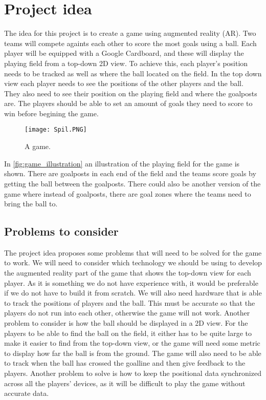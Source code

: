 \section{Project idea}
The idea for this project is to create a game using augmented reality (AR). 
Two teams will compete againts each other to score the most goals using a ball. 
Each player will be equipped with a Google Cardboard, and these will display the playing field from a top-down 2D view. 
To achieve this, each player's position needs to be tracked as well as where the ball located on the field.
In the top down view each player needs to see the positions of the other players and the ball.
They also need to see their position on the playing field and where the goalposts are.
The players should be able to set an amount of goals they need to score to win before begining the game. 
\begin{figure}[H]
    \centering
    \texttt{[image: Spil.PNG]}
    \caption{A game.}
    \label{fig:game_illustration}
\end{figure}
In \autoref{fig:game_illustration} an illustration of the playing field for the game is shown. There are goalposts in each end of the field and the teams score goals by getting the ball between the goalposts. There could also be another version of the game where instead of goalposts, there are goal zones where the teams need to bring the ball to.
\subsection{Problems to consider}
The project idea proposes some problems that will need to be solved for the game to work. We will need to consider which technology we should be using to develop the augmented reality part of the game that shows the top-down view for each player. 
As it is something we do not have experience with, it would be preferable if we do not have to build it from scratch.
We will also need hardware that is able to track the positions of players and the ball.
This must be accurate so that the players do not run into each other, otherwise the game will not work.
Another problem to consider is how the ball should be displayed in a 2D view.
For the players to be able to find the ball on the field, it either has to be quite large to make it easier to find from the top-down view, or the game will need some metric to display how far the ball is from the ground.
The game will also need to be able to track when the ball has crossed the goalline and then give feedback to the players.
Another problem to solve is how to keep the positional data synchronized across all the players' devices, as it will be difficult to play the game without accurate data.
